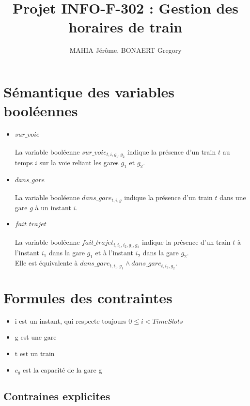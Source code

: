 \documentclass[a4paper]{article}
\title{Projet INFO-F-302 : Gestion des horaires de train}
\author{MAHIA Jérôme, BONAERT Gregory}
\begin{document}
\maketitle

\section{Sémantique des variables booléennes}

\begin{itemize}
\item $sur\_voie$ 
\\
\\
La variable booléenne $sur\_voie_{t,i,g_{1},g_{2}}$ indique la présence d'un train $t$ au temps $i$ sur la voie reliant les gares $g_{1}$ et $g_{2}$.
\item $dans\_gare$
\\
\\
La variable booléenne $dans\_gare_{t,i,g}$ indique la présence d'un train $t$ dans une gare $g$ à un instant $i$.
\item $fait\_trajet$
\\
\\
La variable booléenne $fait\_trajet_{t,i_{1},i_{2},g_{1},g_{2}}$ indique la présence d'un train $t$ à l'instant $i_{1}$ dans la gare $g_{1}$ et à l'instant $i_{2}$ dans la gare $g_{2}$. \\ Elle est équivalente à $dans\_gare_{t,i_{1},g_{1}} \land dans\_gare_{t,i_{2},g_{2}}$.
\end{itemize}


\section{Formules des contraintes}


\begin{itemize}
\item i est un instant, qui respecte toujours $0 \leq i < TimeSlots$
\item g est une gare
\item t est un train
\item $c_g$ est la capacité de la gare g
\end{itemize}

\subsection{Contraines explicites}
\end{document}
